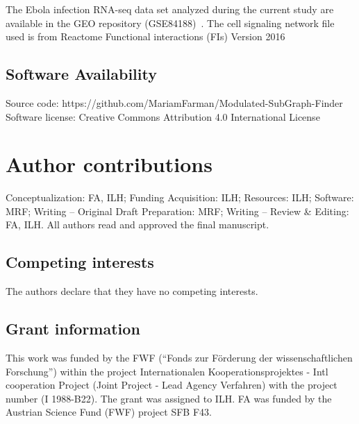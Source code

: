 \documentclass[10pt,a4paper,twocolumn]{article}
\begin{document}
The Ebola infection RNA-seq data set analyzed during the current study are
available in the GEO repository (GSE84188)~\cite{Olejnik}. The cell
signaling network file used is from Reactome Functional interactions (FIs)
Version 2016~\cite{Cytokegg}

\subsection*{Software Availability}

\noindent
Source code:
https://github.com/MariamFarman/Modulated-SubGraph-Finder \newline Software
license: Creative Commons Attribution 4.0 International License

\section*{Author contributions}
Conceptualization: FA, ILH; Funding Acquisition: ILH; Resources: ILH;
Software: MRF; Writing – Original Draft Preparation: MRF; Writing – Review
\& Editing: FA, ILH. All authors read and approved the final manuscript.

\subsection*{Competing interests}

The authors declare that they have no competing interests.

\subsection*{Grant information}

This work was funded by the FWF (“Fonds zur F{\"o}rderung der
wissenschaftlichen Forschung”) within the project Internationalen
Kooperationsprojektes - Intl cooperation Project (Joint Project - Lead
Agency Verfahren) with the project number (I 1988-B22). The grant was
assigned to ILH. FA was funded by the Austrian Science Fund (FWF) project
SFB F43.


{\small
}

\bigskip



\begin{figure}
	\centering

\end{figure}
\end{document}
